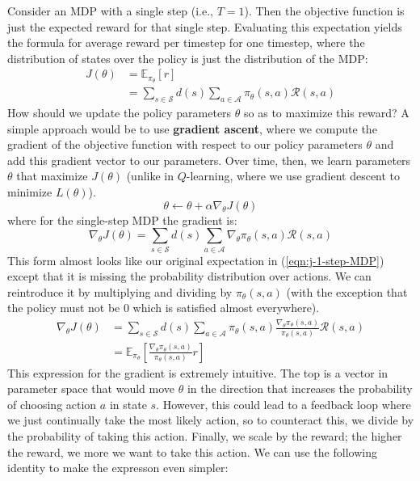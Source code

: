 \documentclass[journal, onecolumn, 12pt, draftclsnofoot]{IEEEtran}
\newcommand{\kword}[1]{\textbf{#1}}
\newcommand{\mc}[1]{\mathcal{#1}}
\begin{document}
		Consider an MDP with a single step (i.e., $T=1$). Then the objective function is just the expected reward for that single step. Evaluating this expectation yields the formula for average reward per timestep for one timestep, where the distribution of states over the policy is just the distribution of the MDP:
		\begin{align}
			\label{eqn:j-1-step-MDP}
			J(\theta) &= \mathbb{E}_{\pi_\theta} \left[ r \right] \\
			  				&=\sum_{s \in \mc{S}} d(s) \sum_{a \in \mc{A}} \pi_\theta (s, a) \mc{R}(s,a) \nonumber
		\end{align}
		How should we update the policy parameters $\theta$ so as to maximize this reward? A simple approach would be to use \kword{gradient ascent}, where we compute the gradient of the objective function with respect to our policy parameters $\theta$ and add this gradient vector to our parameters. Over time, then, we learn parameters $\theta$ that maximize $J(\theta)$ (unlike in $Q$-learning, where we use gradient descent to minimize $L(\theta)$).
		\begin{equation}
			\label{eqn:gradient-ascent}
			\theta \gets \theta + \alpha \nabla_\theta J(\theta)
		\end{equation}
		where for the single-step MDP the gradient is:
		\begin{equation}
			\label{eqn:gradient-of-j}
			\nabla_\theta J(\theta) = \sum_{s \in \mc{S}} d(s) \sum_{a \in \mc{A}} \nabla_\theta \pi_\theta (s, a) \mc{R}(s,a)
		\end{equation}
		This form almost looks like our original expectation in (\ref{eqn:j-1-step-MDP}) except that it is missing the probability distribution over actions. We can reintroduce it by multiplying and dividing by $\pi_\theta(s,a)$ (with the exception that the policy must not be 0 which is satisfied almost everywhere).
		\begin{align}
			\label{eqn:gradient-ascent-mult-div}
			\nabla_\theta J(\theta) &= \sum_{s \in \mc{S}} d(s) \sum_{a \in \mc{A}} \pi_\theta (s, a) \frac{\nabla_\theta \pi_\theta (s, a)}{\pi_\theta (s, a)} \mc{R}(s,a) \\
			&= \mathbb{E}_{\pi_\theta} \left[ \frac{\nabla_\theta \pi_\theta (s, a)}{\pi_\theta (s, a)} r \right]
		\end{align}
		This expression for the gradient is extremely intuitive. The top is a vector in parameter space that would move $\theta$ in the direction that increases the probability of choosing action $a$ in state $s$. However, this could lead to a feedback loop where we just continually take the most likely action, so to counteract this, we divide by the probability of taking this action. Finally, we scale by the reward; the higher the reward, we more we want to take this action. We can use the following identity to make the expresson even simpler:
\end{document}
